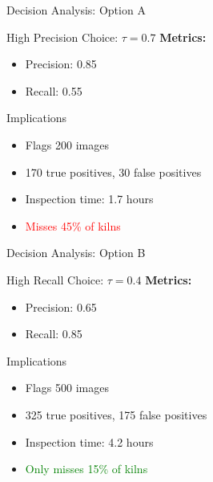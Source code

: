 \documentclass{beamer}
\begin{document}
\begin{frame}{Decision Analysis: Option A}
\begin{block}{High Precision Choice: $\tau = 0.7$}
\textbf{Metrics:}
\begin{itemize}
    \item Precision: 0.85
    \item Recall: 0.55
\end{itemize}
\end{block}

\vspace{0.3cm}

\begin{examplebox}{Implications}
\begin{itemize}
    \item Flags 200 images
    \item 170 true positives, 30 false positives
    \item Inspection time: 1.7 hours
    \item \textcolor{red}{Misses 45\% of kilns}
\end{itemize}
\end{examplebox}
\end{frame}

\begin{frame}{Decision Analysis: Option B}
\begin{block}{High Recall Choice: $\tau = 0.4$}
\textbf{Metrics:}
\begin{itemize}
    \item Precision: 0.65
    \item Recall: 0.85
\end{itemize}
\end{block}

\vspace{0.3cm}

\begin{examplebox}{Implications}
\begin{itemize}
    \item Flags 500 images
    \item 325 true positives, 175 false positives
    \item Inspection time: 4.2 hours
    \item \textcolor{green}{Only misses 15\% of kilns}
\end{itemize}
\end{examplebox}
\end{frame}
\end{document}
